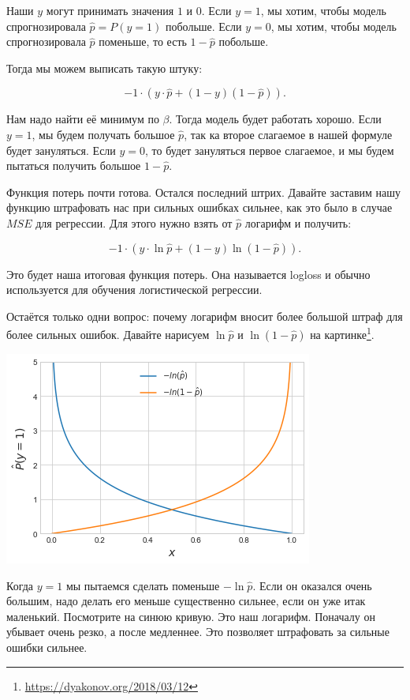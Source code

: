 \documentclass[12pt, a4paper, oneside]{article}
\begin{document}
Наши $y$ могут принимать значения $1$ и $0$. Если $y = 1$, мы хотим, чтобы модель спрогнозировала $\hat p = P(y= 1)$ побольше.  Если $y = 0$, мы хотим, чтобы модель спрогнозировала $\hat p$ поменьше, то есть $ 1 - \hat p$ побольше. 

Тогда мы можем выписать такую штуку: 

$$
-1 \cdot (y \cdot \hat p  + (1 - y) (1 - \hat p)).
$$

Нам надо найти её минимум по $\beta$. Тогда модель будет работать хорошо. Если $y = 1$, мы будем получать большое $\hat p$, так ка второе слагаемое в нашей формуле будет зануляться. Если $y = 0$, то будет зануляться первое слагаемое, и мы будем пытаться получить большое $1 - \hat p$. 

Функция потерь почти готова. Остался последний штрих.  Давайте заставим нашу функцию штрафовать нас при сильных ошибках сильнее, как это было в случае $MSE$ для регрессии. Для этого нужно взять от $\hat p$ логарифм и получить: 

$$
-1 \cdot (y \cdot \ln \hat p  + (1 - y)  \ln (1 - \hat p)).
$$

Это будет наша итоговая функция потерь. Она называется logloss и обычно используется для обучения логистической регрессии. 

Остаётся только одни вопрос: почему логарифм вносит более большой штраф для более сильных ошибок.  Давайте нарисуем $\ln \hat p$ и $\ln (1 - \hat p)$ на картинке\footnote{{\color{blue} \url{https://dyakonov.org/2018/03/12}}}.


\begin{center}
	\includegraphics[scale=0.7]{log_loss_05.png}
\end{center}


Когда $y=1$ мы пытаемся сделать поменьше $- \ln \hat p$. Если он оказался очень большим, надо делать его меньше существенно сильнее, если он уже итак маленький. Посмотрите на синюю кривую. Это наш логарифм. Поначалу он убывает очень резко, а после медленнее. Это позволяет штрафовать за сильные ошибки сильнее. 
\end{document}
